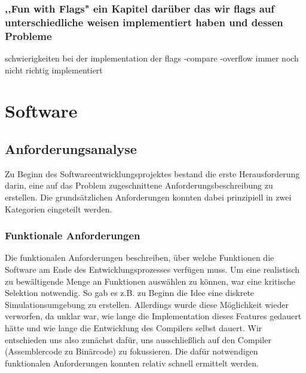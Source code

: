 \documentclass[paper=a4,fontsize=12pt,twocolumn]{scrreprt}
\begin{document}
\subsection{,,Fun with Flags" ein Kapitel darüber das wir flags auf unterschiedliche weisen implementiert haben und dessen Probleme}

schwierigkeiten bei der implementation der flags
-compare
-overflow immer noch nicht richtig implementiert

\chapter{Software}

\section{Anforderungsanalyse}
Zu Beginn des Softwareentwicklungsprojektes bestand die erste Herausforderung darin, eine auf das Problem zugeschnittene Anforderungsbeschreibung zu erstellen.
Die grundsätzlichen Anforderungen konnten dabei prinzipiell in zwei Kategorien eingeteilt werden. %

\subsection{Funktionale Anforderungen}


Die funktionalen Anforderungen beschreiben, über welche Funktionen die Software am Ende des Entwicklungsprozesses verfügen muss.
Um eine realistisch zu bewältigende Menge an Funktionen auswählen zu können, war eine  kritische Selektion notwendig. 
So gab es z.B. zu Beginn die Idee eine diskrete Simulationsumgebung zu erstellen. Allerdings wurde diese Möglichkeit wieder verworfen, da unklar war, wie lange die Implementation dieses Features gedauert hätte und wie lange die Entwicklung des Compilers selbst dauert.
Wir entschieden uns also zunächst dafür, uns ausschließlich auf den Compiler (Assemblercode zu Binärcode) zu fokussieren.
Die dafür notwendigen funktionalen Anforderungen konnten relativ schnell ermittelt werden.
\end{document}
